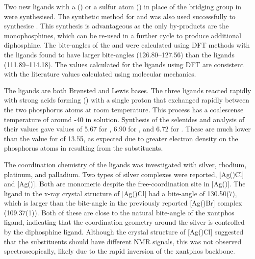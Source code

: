 Two new \tBuxantphos{} ligands with a  (\tBusixantphos) or a sulfur atom (\tButhixantphos) in place of the  bridging group in \tBuxantphos{} were synthesised.  The synthetic method for \tBusixantphos{} and \tButhixantphos{} was also used successfully to synthesise \tBuxantphos{}.  This synthesis is advantageous as the only by-products are the monophosphines, which can be re-used in a further cycle to produce additional diphosphine.  The bite-angles of the \tBuxantphos{} and \Phxantphos{} were calculated using \gls{DFT} methods with the \tBuxantphos{} ligands found to have larger bite-angles (126.80--127.56\degrees{}) than the \Phxantphos{} ligands (111.89--114.18\degrees{}).  The values calculated for the \Phxantphos{} ligands using DFT are consistent with the literature values calculated using molecular mechanics.  

The \tBuxantphos{} ligands are both Br\o nsted and Lewis bases.  The three ligands reacted rapidly with strong acids forming (\tBuxantphos) with a single proton that exchanged rapidly between the two phosphorus atoms at room temperature.  This process has a coalescense temperature of around -40 \degC{} in solution.  Synthesis of the \tBuxantphos{} selenides and analysis of their \JPSe{} values gave \pKb{} values of 5.67 for \tBusixantphos, 6.90 for \tButhixantphos{}, and 6.72 for \tBuxantphos{}.  These are much lower than the value for \Phxantphos{} of 13.55, as expected due to greater electron density on the phosphorus atoms in \tBuxantphos{} resulting from the \tBu{} substituents.  

The coordination chemistry of the \tBuxantphos{} ligands was investigated with silver, rhodium, platinum, and palladium.  Two types of silver complexes were reported, [Ag(\tBuxantphos)Cl] and [Ag(\tBuxantphos)].  Both are monomeric despite the free-coordination site in [Ag(\tBuxantphos)].  The \tButhixantphos{} ligand in the x-ray crystal structure of [Ag(\tButhixantphos)Cl] had a bite-angle of 130.50(7)\degrees{}, which is larger than the bite-angle in the previously reported [Ag(\Phxantphos)Br] complex (109.37(1)\degrees{}).  Both of these are close to the natural bite-angle of the xantphos ligand, indicating that the coordination geometry around the silver is controlled by the diphosphine ligand.  Although the crystal structure of [Ag(\tButhixantphos)Cl] suggested that the \tBu{} substituents should have different NMR signals, this was not observed spectroscopically, likely due to the rapid inversion of the xantphos backbone.  

